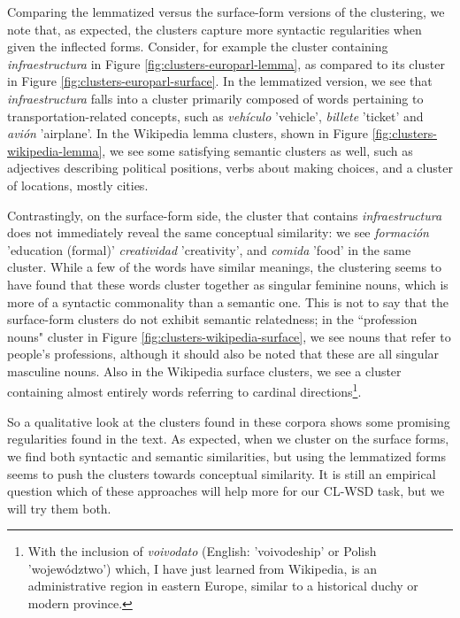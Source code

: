Comparing the lemmatized versus the surface-form versions of the clustering, we
note that, as expected, the clusters capture more syntactic regularities when
given the inflected forms. Consider, for example the cluster containing
\emph{infraestructura} in Figure \ref{fig:clusters-europarl-lemma}, as compared
to its cluster in Figure \ref{fig:clusters-europarl-surface}. In the lemmatized
version, we see that \emph{infraestructura} falls into a cluster primarily
composed of words pertaining to transportation-related concepts, such as
\emph{vehículo} 'vehicle', \emph{billete} 'ticket' and \emph{avión} 'airplane'.
In the Wikipedia lemma clusters, shown in Figure
\ref{fig:clusters-wikipedia-lemma}, we see some satisfying semantic clusters as
well, such as adjectives describing political positions, verbs about making
choices, and a cluster of locations, mostly cities.

Contrastingly, on the surface-form side, the cluster that contains
\emph{infraestructura} does not immediately reveal the same conceptual
similarity: we see \emph{formación} 'education (formal)' \emph{creatividad}
'creativity', and \emph{comida} 'food' in the same cluster. While a few of the
words have similar meanings, the clustering seems to have found that these
words cluster together as singular feminine nouns, which is more of a
syntactic commonality than a semantic one. This is not to say that the
surface-form clusters do not exhibit semantic relatedness; in the ``profession
nouns" cluster in Figure \ref{fig:clusters-wikipedia-surface}, we see nouns
that refer to people's professions, although it should also be noted that these
are all singular masculine nouns. Also in the Wikipedia surface clusters, we
see a cluster containing almost entirely words referring to cardinal
directions\footnote{With the inclusion of \emph{voivodato} (English:
'voivodeship' or Polish 'województwo') which, I have just learned from
Wikipedia, is an administrative region in eastern Europe, similar to a
historical duchy or modern province.}.

So a qualitative look at the clusters found in these corpora shows some
promising regularities found in the text. As expected, when we cluster on the
surface forms, we find both syntactic and semantic similarities, but using the
lemmatized forms seems to push the clusters towards conceptual similarity. It
is still an empirical question which of these approaches will help more for our
CL-WSD task, but we will try them both.

